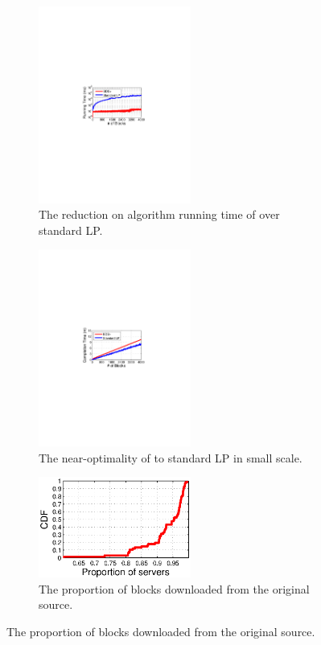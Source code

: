 \begin{figure}[t]
        \centering
        \begin{subfigure}[b]{0.3\textwidth}
                \centering
                \includegraphics[width=50mm]{images/BDSvsLP_journal.pdf} %
                \caption{The reduction on algorithm running time of \name over standard LP.}
                \label{fig:further:BDSvsLP}
        \end{subfigure}
        \begin{subfigure}[b]{0.3\textwidth}
                \centering
                \includegraphics[width=50mm]{images/BDSvsLP_CT_journal.pdf}%
                \caption{The near-optimality of \name to standard LP in small scale.}
                \label{fig:further:BDSvsLP_CT}
        \end{subfigure}
        \begin{subfigure}[b]{0.3\textwidth}
                \centering
                \includegraphics[width=50mm]{images/overlay.eps}
                \caption{The proportion of blocks downloaded from the original source.}
                \label{fig:further:overlay}
        \end{subfigure}
        \label{fig:further}
\end{figure}

